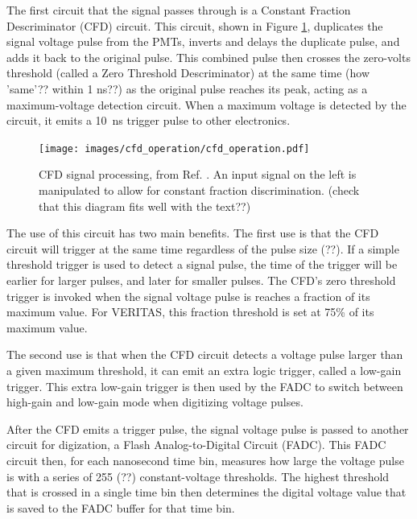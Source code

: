 The first circuit that the signal passes through is a Constant Fraction Descriminator (CFD) circuit.
This circuit, shown in Figure \ref{fig:cfd_operation}, duplicates the signal voltage pulse from the PMTs, inverts and delays the duplicate pulse, and adds it back to the original pulse.
This combined pulse then crosses the zero-volts threshold (called a Zero Threshold Descriminator) at the same time {\color{red}(how 'same'?? within 1 ns??)} as the original pulse reaches its peak, acting as a maximum-voltage detection circuit.
When a maximum voltage is detected by the circuit, it emits a \SI{10}{ns} trigger pulse to other electronics.

\begin{figure}[ht]
  \centering
  \texttt{[image: images/cfd\_operation/cfd\_operation.pdf]}
  \caption[CFD Operation]{
    CFD signal processing, from Ref. \cite{cfd_operation}.
    An input signal on the left is manipulated to allow for constant fraction discrimination.
    {\color{red}(check that this diagram fits well with the text??)}
  }
  \label{fig:cfd_operation}
\end{figure}

The use of this circuit has two main benefits.
{\color{red} The first use is that the CFD circuit will trigger at the same time regardless of the pulse size (??).}
If a simple threshold trigger is used to detect a signal pulse, the time of the trigger will be earlier for larger pulses, and later for smaller pulses.
The CFD's zero threshold trigger is invoked when the signal voltage pulse is reaches a fraction of its maximum value.
For VERITAS, this fraction threshold is set at 75\% of its maximum value.

The second use is that when the CFD circuit detects a voltage pulse larger than a given maximum threshold, it can emit an extra logic trigger, called a low-gain trigger.
This extra low-gain trigger is then used by the FADC to switch between high-gain and low-gain mode when digitizing voltage pulses.




After the CFD emits a trigger pulse, the signal voltage pulse is passed to another circuit for digization, a Flash Analog-to-Digital Circuit (FADC).
This FADC circuit then, for each nanosecond time bin, measures how large the voltage pulse is with a series of 255 {\color{red}(??)} constant-voltage thresholds.
The highest threshold that is crossed in a single time bin then determines the digital voltage value that is saved to the FADC buffer for that time bin.

